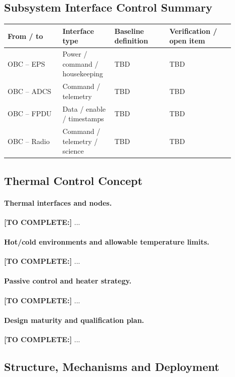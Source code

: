 
\subsection{Subsystem Interface Control Summary}\label{sec:subsystem-interfaces}
\begin{longtable}{p{0.22\linewidth}p{0.19\linewidth}p{0.22\linewidth}p{0.26\linewidth}}
\toprule
From / to & Interface type & Baseline definition & Verification / open item \\
\midrule
\endhead
OBC -- EPS & Power / command / housekeeping & TBD & TBD \\
OBC -- ADCS & Command / telemetry & TBD & TBD \\
OBC -- FPDU & Data / enable / timestamps & TBD & TBD \\
OBC -- Radio & Command / telemetry / science & TBD & TBD \\
\bottomrule
\end{longtable}

\subsection{Thermal Control Concept}\label{sec:thermal-architecture}
\paragraph{Thermal interfaces and nodes.} \textbf{[TO COMPLETE:]} ...
\paragraph{Hot/cold environments and allowable temperature limits.} \textbf{[TO COMPLETE:]} ...
\paragraph{Passive control and heater strategy.} \textbf{[TO COMPLETE:]} ...
\paragraph{Design maturity and qualification plan.} \textbf{[TO COMPLETE:]} ...

\subsection{Structure, Mechanisms and Deployment}\label{sec:structure-architecture}
